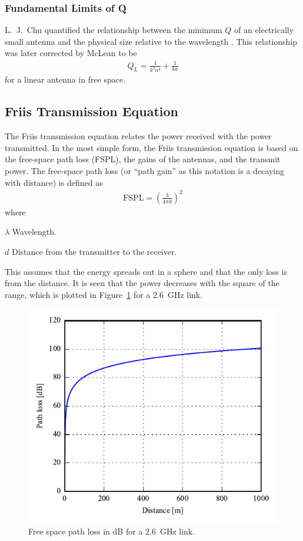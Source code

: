 \subsubsection{Fundamental Limits of Q}
\label{sec:fun_lim}
L.\ J.\ Chu quantified the relationship between the minimum $Q$ of an electrically small antenna and the physical size relative to the wavelength \cite{chu1948}. This relationship was later corrected by McLean \cite{mclean1996} to be
\begin{align} %
  Q_L = \frac{1}{k^3a^3}+ \frac{1}{ka}
\end{align}
for a linear antenna in free space.

\subsection{Friis Transmission Equation}
The Friis transmission equation relates the power received with the power transmitted. In the most simple form, the Friis transmission equation is based on the free-space path loss (FSPL), the gains of the antennas, and the transmit power. The free-space path loss (or ``path gain'' as this notation is a decaying with distance) is defined as \cite{balanis2012antenna}
\begin{align} %
  \label{eq:fspl}
  \text{FSPL} = \left( \frac{\lambda}{4 \pi d} \right)^2 
\end{align}
where
\begin{where}
\item[$\lambda$] Wavelength.
\item[$d$] Distance from the transmitter to the receiver.
\end{where}
This assumes that the energy spreads out in a sphere and that the only loss is from the distance. It is seen that the power decreases with the square of the range, which is plotted in Figure~\ref{fig:fspl-plot} for a \SI{2.6}{GHz} link.

\begin{figure}[htbp]
  \centering
  \includegraphics{img/analysis/distancePathloss}
  \caption{Free space path loss in dB for a \SI{2.6}{GHz} link.}
  \label{fig:fspl-plot}
\end{figure}

